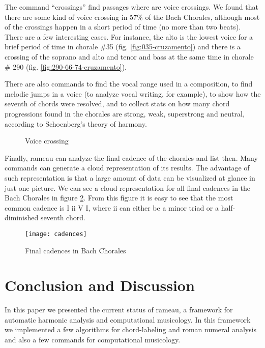 The command ``crossings'' find passages where are voice crossings. We
found that there are some kind of voice crossing in 57\% of the Bach
Chorales, although most of the crossings happen in a short period of
time (no more than two beats). There are a few interesting cases. For
instance, the alto is the lowest voice for a brief period of time in
chorale \#35 (fig. \ref{fig:035-cruzamento}) and there is a crossing
of the soprano and alto and tenor and bass at the same time in chorale
\# 290 (fig. \ref{fig:290-66-74-cruzamento}).

There are also commands to find the vocal range used in a composition,
to find melodic jumps in a voice (to analyze vocal writing, for
example), to show how the seventh of chords were resolved, and to
collect stats on how many chord progressions found in the chorales are
strong, weak, superstrong and neutral, according to Schoenberg's
theory of harmony.

\begin{figure}[!h]
  \centering
  \caption{Voice crossing}
  \label{fig:coral-003}
\end{figure}

Finally, rameau can analyze the final cadence of the chorales and list
then. Many commands can generate a cloud representation of its
results. The advantage of such representation is that a large amount
of data can be visualized at glance in just one picture. We can see a
cloud representation for all final cadences in the Bach Chorales in
figure \ref{fig:cadences}. From this figure it is easy to see that the
most common cadence is I ii V I, where ii can either be a minor triad
or a half-diminished seventh chord.

\begin{figure}
  \centering
  \texttt{[image: cadences]}
  \caption{Final cadences in Bach Chorales}
  \label{fig:cadences}
\end{figure}

\section{Conclusion and Discussion}
\label{sec:conclusion}

In this paper we presented the current status of rameau, a framework
for automatic harmonic analysis and computational musicology. In this
framework we implemented a few algorithms for chord-labeling and roman
numeral analysis and also a few commands for computational musicology.

